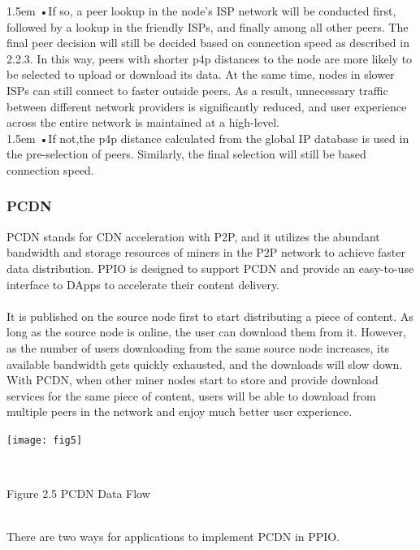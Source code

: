 \documentclass[10pt,a4paper]{article}
\begin{document}
\hangindent 1.5em
\noindent   
•\quad If so, a peer lookup in the node’s ISP network will be conducted first, followed by a lookup in the friendly ISPs, and finally among all other peers. The final peer decision will still be decided based on connection speed as described in 2.2.3. In this way, peers with shorter p4p distances to the node are more likely to be selected to upload or download its data. At the same time, nodes in slower ISPs can still connect to faster outside peers. As a result, unnecessary traffic between different network providers is significantly reduced, and user experience across the entire network is maintained at a high-level.
\vspace{-0.8em}
\\

\hangindent 1.5em
\noindent   
•\quad  If not,the p4p distance calculated from the global IP database is used in the pre-selection of peers. Similarly, the final selection will still be based connection speed.
\vspace{-0.8em}

 
         \subsubsection{PCDN}  %
PCDN stands for CDN acceleration with P2P, and it utilizes the abundant bandwidth and storage resources of miners in the P2P network to achieve faster data distribution. PPIO is designed to support PCDN and provide an easy-to-use interface to DApps to accelerate their content delivery. 
\vspace{-0.5em}
\\ \\It is published on the source node first to start distributing a piece of content. As long as the source node is online, the user can download them from it. However, as the number of users downloading from the same source node increases, its available bandwidth gets quickly exhausted, and the downloads will slow down. With PCDN, when other miner nodes start to store and provide download services for the same piece of content, users will be able to download from multiple peers in the network and enjoy much better user experience.\\
\centerline{\texttt{[image: fig5]}}
\vspace{-0.5em}
 \\ \centerline{{Figure 2.5 PCDN Data Flow}}
\vspace{-0.5em}
 \\ There are two ways for applications to implement PCDN in PPIO.
\vspace{-0.7em}
\\
\end{document}
